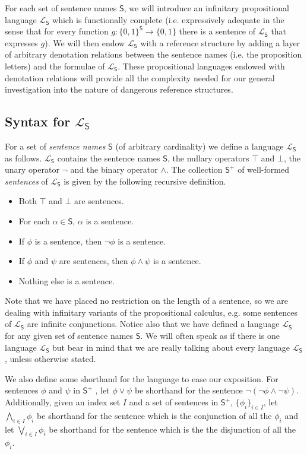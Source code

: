 \documentclass[12pt]{article}
\theoremstyle{remark}
\newcommand{\prg}{\hspace{0.25in}}
\newcommand{\fancy}[1]{\mathcal{#1}}
\def\S{\textsf{S}}
\def\L{\fancy{L}}
\begin{document}
For each set of sentence names $\S$, we will introduce an infinitary propositional language $\L_\S$ which is functionally complete (i.e. expressively adequate in the sense that for every function $g: \{0,1\}^{\S} \rightarrow \{0,1\}$ there is a sentence of $\L_\S$ that expresses $g$). We will then endow $\L_\S$ with a reference structure by adding a layer of arbitrary denotation relations between the sentence names (i.e. the proposition letters) and the formulae of $\L_\S$. These propositional languages endowed with denotation relations will provide all the complexity needed for our general investigation into the nature of dangerous reference structures.

\subsection{Syntax for $\L_\S$}

\noindent For a set of \textit{sentence names} $\S$ (of arbitrary cardinality) we define a language $\L_\S$ as follows. $\L_\S$ contains the sentence names $\S$, the nullary operators $\top$ and $\bot$, the unary operator $\neg$ and the binary operator $\wedge$.  The collection $\S^{+}$ of well-formed \textit{sentences} of $\L_\S$ is given by the following recursive definition.

\begin{itemize}
\item Both $\top$ and $\bot$ are sentences. 
\item For each $\alpha \in  \S$, $\alpha$ is a sentence.
\item If $\phi$ is a sentence, then $\neg \phi$ is a sentence.
\item If $\phi$ and $\psi$ are sentences, then $\phi \wedge \psi$ is a sentence.
\item Nothing else is a sentence.
\end{itemize}

Note that we have placed no restriction on the length of a sentence, so we are dealing with infinitary variants of the propositional calculus, e.g. some sentences of $\L_\S$ are infinite conjunctions. Notice also that we have defined a language $\L_\S$ for any given set of sentence names $\S$. We will often speak as if there is one language $\L_\S$ but bear in mind that we are really talking about every language $\L_\S$, unless otherwise stated.

\prg We also define some shorthand for the language to ease our exposition.  For sentences $\phi$ and $\psi$ in $\S^{+}$ , let $\phi \vee \psi$ be shorthand for the sentence $\neg (\neg \phi \wedge \neg \psi)$.  Additionally, given an index set $I$ and a set of sentences in $\S^{+}$, $\{\phi_i\}_{i \in I}$, let $\bigwedge_{i \in I} \phi_i$ be shorthand for the sentence which is the conjunction of all the $\phi_i$ and let $\bigvee_{i \in I} \phi_i$ be shorthand for the sentence which is the  the disjunction of all the $\phi_i$.
\end{document}
